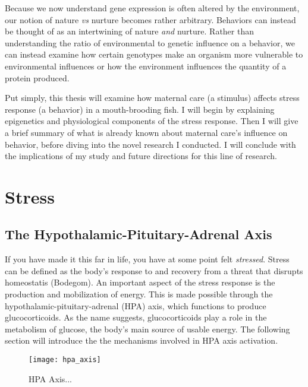 \documentclass[12pt,twoside]{reedthesis}
\begin{document}
Because we now understand gene expression is often altered by the environment, our notion of
nature \textit{vs} nurture becomes rather arbitrary. Behaviors can instead be
thought of as an intertwining of nature \textit{and} nurture. Rather than
understanding the ratio of environmental to genetic influence on a behavior, we
can instead examine how certain genotypes make an organism more vulnerable to
environmental influences or how the environment influences the quantity of a
protein produced. 

Put simply, this thesis will examine how maternal care (a stimulus) affects
stress response (a behavior) in a mouth-brooding fish. I will begin by
explaining epigenetics and physiological components of the stress response. Then
I will give a brief summary of what is already known about maternal care's
influence on behavior, before diving into the novel research I conducted. I will
conclude with the implications of my study and future directions for this
line of research.

\chapter{Stress}

\section{The Hypothalamic-Pituitary-Adrenal Axis}
If you have made it this far in life, you have at some point felt
\textit{stressed}. Stress can be
defined as the body's response to and recovery from a threat that disrupts
homeostatis (Bodegom). An important aspect of the stress response is the production and mobilization
 of energy. This is made possible through the hypothalamic-pituitary-adrenal (HPA)
 axis, which functions to produce glucocorticoids. As the name suggests,
 glucocorticoids play a role in the metabolism of glucose, the body's main
 source of usable energy. The following section
 will introduce the the mechanisms involved in HPA axis activation.

\begin{figure}[htbp] 
\begin{centering} 
\texttt{[image: hpa\_axis]}
\caption[HPA Axis]{HPA Axis...} 
\label{subd}
\end{centering} 
\end{figure}
\end{document}
